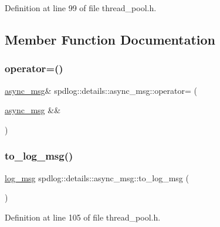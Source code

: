 Definition at line 99 of file thread\+\_\+pool.\+h.



\subsection{Member Function Documentation}
\mbox{\label{structspdlog_1_1details_1_1async__msg_a963cf593d81367843c4347603a18c5f8}} 
\subsubsection{\texorpdfstring{operator=()}{operator=()}}
{\footnotesize\ttfamily \hyperlink{structspdlog_1_1details_1_1async__msg}{async\+\_\+msg}\& spdlog\+::details\+::async\+\_\+msg\+::operator= (\begin{DoxyParamCaption}\item[{\hyperlink{structspdlog_1_1details_1_1async__msg}{async\+\_\+msg} \&\&}]{ }\end{DoxyParamCaption})\hspace{0.3cm}{\ttfamily [default]}}

\mbox{\label{structspdlog_1_1details_1_1async__msg_a2c5c21ef52bd0b7241ed6ac56f480fd2}} 
\subsubsection{\texorpdfstring{to\+\_\+log\+\_\+msg()}{to\_log\_msg()}}
{\footnotesize\ttfamily \hyperlink{structspdlog_1_1details_1_1log__msg}{log\+\_\+msg} spdlog\+::details\+::async\+\_\+msg\+::to\+\_\+log\+\_\+msg (\begin{DoxyParamCaption}{ }\end{DoxyParamCaption})\hspace{0.3cm}{\ttfamily [inline]}}



Definition at line 105 of file thread\+\_\+pool.\+h.


